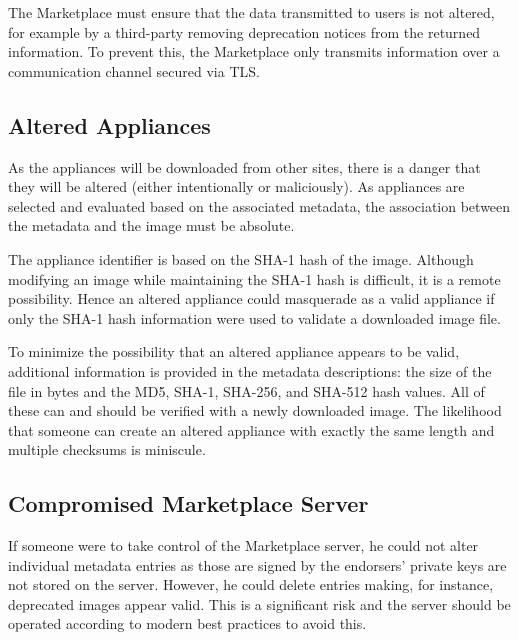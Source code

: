 The Marketplace must ensure that the data transmitted to users is not
altered, for example by a third-party removing deprecation notices
from the returned information.  To prevent this, the Marketplace only
transmits information over a communication channel secured via TLS\@. 

\subsection{Altered Appliances}

As the appliances will be downloaded from other sites, there is a danger
that they will be altered (either intentionally or maliciously).  As
appliances are selected and evaluated based on the associated
metadata, the association between the metadata and the image must be
absolute. 

The appliance identifier is based on the SHA-1 hash of the image.
Although modifying an image while maintaining the SHA-1 hash is
difficult, it is a remote possibility.  Hence an altered appliance
could masquerade as a valid appliance if only the SHA-1 hash
information were used to validate a downloaded image file.

To minimize the possibility that an altered appliance appears to be
valid, additional information is provided in the metadata
descriptions: the size of the file in bytes and the MD5, SHA-1,
SHA-256, and SHA-512 hash values.  All of these can and should be
verified with a newly downloaded image.  The likelihood that someone
can create an altered appliance with exactly the same length and
multiple checksums is miniscule.

\subsection{Compromised Marketplace Server}

If someone were to take control of the Marketplace server, he could
not alter individual metadata entries as those are signed by the
endorsers' private keys are not stored on the server.  However, he
could delete entries making, for instance, deprecated images appear
valid.  This is a significant risk and the server should be operated
according to modern best practices to avoid this.
